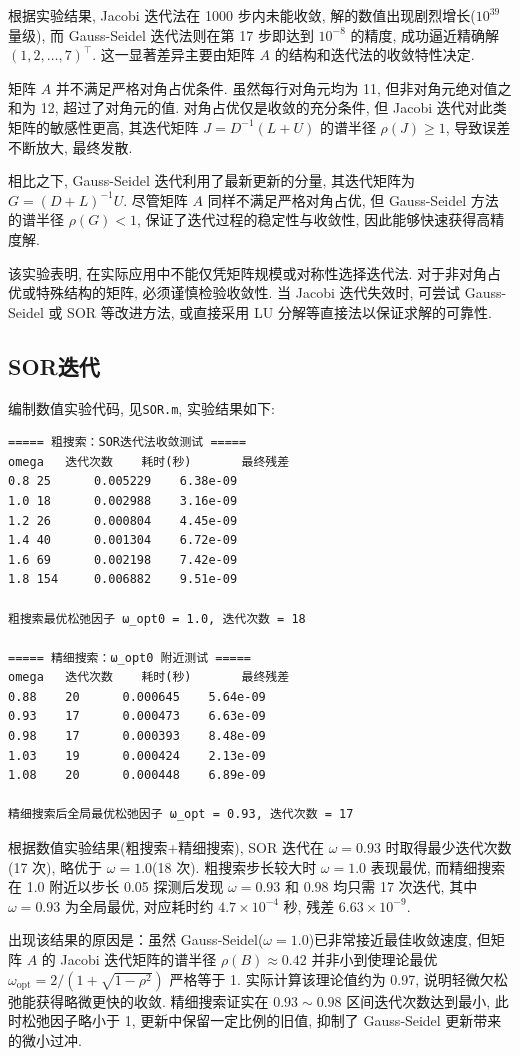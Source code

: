 \documentclass[zihao=-4,a4paper]{ctexart}
\begin{document}
根据实验结果, Jacobi 迭代法在 1000 步内未能收敛, 解的数值出现剧烈增长($10^{39}$ 量级), 而 Gauss-Seidel 迭代法则在第 17 步即达到 $10^{-8}$ 的精度, 成功逼近精确解 $(1,2,\dots,7)^\top$. 这一显著差异主要由矩阵 $A$ 的结构和迭代法的收敛特性决定. 

矩阵 $A$ 并不满足严格对角占优条件. 虽然每行对角元均为 11, 但非对角元绝对值之和为 12, 超过了对角元的值. 对角占优仅是收敛的充分条件, 但 Jacobi 迭代对此类矩阵的敏感性更高, 其迭代矩阵 $J = D^{-1}(L+U)$ 的谱半径 $\rho(J) \ge 1$, 导致误差不断放大, 最终发散. 

相比之下, Gauss-Seidel 迭代利用了最新更新的分量, 其迭代矩阵为 $G = (D+L)^{-1}U$. 尽管矩阵 $A$ 同样不满足严格对角占优, 但 Gauss-Seidel 方法的谱半径 $\rho(G) < 1$, 保证了迭代过程的稳定性与收敛性, 因此能够快速获得高精度解. 

该实验表明, 在实际应用中不能仅凭矩阵规模或对称性选择迭代法. 对于非对角占优或特殊结构的矩阵, 必须谨慎检验收敛性. 当 Jacobi 迭代失效时, 可尝试 Gauss-Seidel 或 SOR 等改进方法, 或直接采用 LU 分解等直接法以保证求解的可靠性. 
\subsection{SOR迭代}
编制数值实验代码, 见\texttt{SOR.m}, 实验结果如下:
\begin{lstlisting}
===== 粗搜索：SOR迭代法收敛测试 =====
omega	迭代次数	耗时(秒)		最终残差
0.8	25		0.005229	6.38e-09
1.0	18		0.002988	3.16e-09
1.2	26		0.000804	4.45e-09
1.4	40		0.001304	6.72e-09
1.6	69		0.002198	7.42e-09
1.8	154		0.006882	9.51e-09

粗搜索最优松弛因子 ω_opt0 = 1.0, 迭代次数 = 18

===== 精细搜索：ω_opt0 附近测试 =====
omega	迭代次数	耗时(秒)		最终残差
0.88	20		0.000645	5.64e-09
0.93	17		0.000473	6.63e-09
0.98	17		0.000393	8.48e-09
1.03	19		0.000424	2.13e-09
1.08	20		0.000448	6.89e-09

精细搜索后全局最优松弛因子 ω_opt = 0.93, 迭代次数 = 17
\end{lstlisting}

根据数值实验结果(粗搜索+精细搜索), SOR 迭代在 $\omega=0.93$ 时取得最少迭代次数(17 次), 略优于 $\omega=1.0$(18 次). 粗搜索步长较大时 $\omega=1.0$ 表现最优, 而精细搜索在 1.0 附近以步长 0.05 探测后发现 $\omega=0.93$ 和 $0.98$ 均只需 17 次迭代, 其中 $\omega=0.93$ 为全局最优, 对应耗时约 $4.7\times10^{-4}$ 秒, 残差 $6.63\times10^{-9}$.   

出现该结果的原因是：虽然 Gauss‑Seidel($\omega=1.0$)已非常接近最佳收敛速度, 但矩阵 $A$ 的 Jacobi 迭代矩阵的谱半径 $\rho(B)\approx0.42$ 并非小到使理论最优 $\omega_{\text{opt}}=2/(1+\sqrt{1-\rho^2})$ 严格等于 1. 实际计算该理论值约为 0.97, 说明轻微欠松弛能获得略微更快的收敛. 精细搜索证实在 $0.93\sim0.98$ 区间迭代次数达到最小, 此时松弛因子略小于 1, 更新中保留一定比例的旧值, 抑制了 Gauss‑Seidel 更新带来的微小过冲.   
\end{document}
